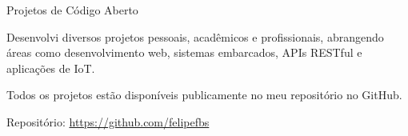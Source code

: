 
\begin{cventries}
  \cventry
  {} %
  {Projetos de Código Aberto} %
  {} %
  {} %
  {
    \begin{cvitems}
      \item {Desenvolvi diversos projetos pessoais, acadêmicos e profissionais, abrangendo áreas como desenvolvimento web, sistemas embarcados, APIs RESTful e aplicações de IoT.}
      \item {Todos os projetos estão disponíveis publicamente no meu repositório no GitHub.}
      \item {Repositório: \url{https://github.com/felipefbs}}
    \end{cvitems}
  }
\end{cventries}
